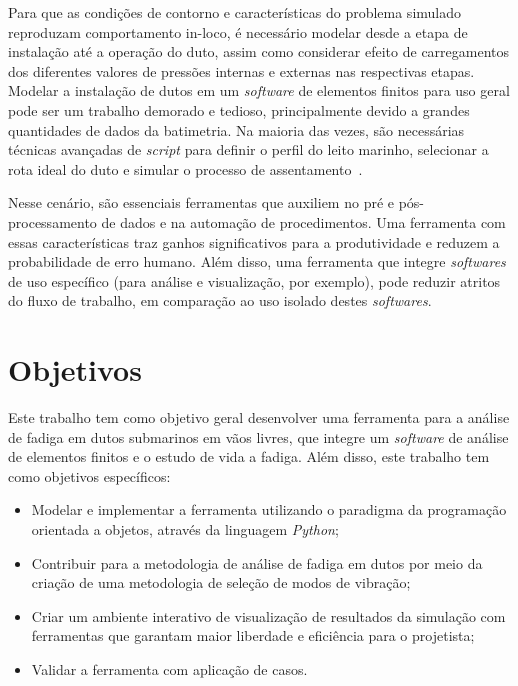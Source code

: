 Para que as condições de contorno e características do problema simulado reproduzam comportamento in-loco, é necessário modelar desde a etapa de instalação até a operação do duto, assim como considerar efeito de carregamentos dos diferentes valores de pressões internas e externas nas respectivas etapas.
Modelar a instalação de dutos em um \textit{software} de elementos finitos para uso geral pode ser um trabalho demorado e tedioso, principalmente devido a grandes quantidades de dados da batimetria.
Na maioria das vezes, são necessárias técnicas avançadas de \textit{script} para definir o perfil do leito marinho, selecionar a rota ideal do duto e simular o processo de assentamento~\cite{VandenAbeele2013}.

Nesse cenário, são essenciais ferramentas que auxiliem no pré e pós-processamento de dados e na automação de procedimentos.
Uma ferramenta com essas características traz ganhos significativos para a produtividade e reduzem a probabilidade de erro humano.
Além disso, uma ferramenta que integre \textit{softwares} de uso específico (para análise e visualização, por exemplo), pode reduzir atritos do fluxo de trabalho, em comparação ao uso isolado destes \textit{softwares}.

\section{Objetivos}

Este trabalho tem como objetivo geral desenvolver uma ferramenta para a análise de fadiga em dutos submarinos em vãos livres, 
que integre um \textit{software} de análise de elementos finitos e o estudo de vida a fadiga.
Além disso, este trabalho tem como objetivos específicos:

\begin{itemize}
    \item Modelar e implementar a ferramenta utilizando o paradigma da programação orientada a objetos, através da linguagem \textit{Python};
    \item Contribuir para a metodologia de análise de fadiga em dutos por meio da criação de uma metodologia de seleção de modos de vibração;
    \item Criar um ambiente interativo de visualização de resultados da simulação com ferramentas que garantam maior liberdade e eficiência para o projetista;
    \item Validar a ferramenta com aplicação de casos.
\end{itemize}

